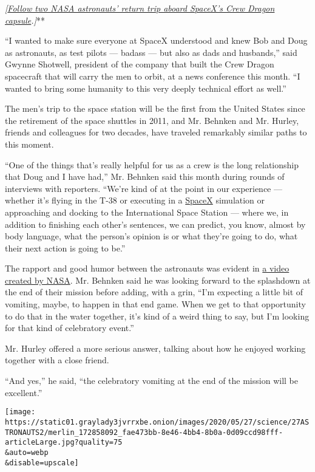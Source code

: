 \emph{\emph{\emph{{[}}\href{https://www.nytimes3xbfgragh.onion/2020/08/02/science/spacex-nasa-return.html}{\emph{Follow
two NASA astronauts' return trip aboard SpaceX's Crew Dragon
capsule}}}.{]}}**

``I wanted to make sure everyone at SpaceX understood and knew Bob and
Doug as astronauts, as test pilots --- badass --- but also as dads and
husbands,'' said Gwynne Shotwell, president of the company that built
the Crew Dragon spacecraft that will carry the men to orbit, at a news
conference this month. ``I wanted to bring some humanity to this very
deeply technical effort as well.''

The men's trip to the space station will be the first from the United
States since the retirement of the space shuttles in 2011, and Mr.
Behnken and Mr. Hurley, friends and colleagues for two decades, have
traveled remarkably similar paths to this moment.

``One of the things that's really helpful for us as a crew is the long
relationship that Doug and I have had,'' Mr. Behnken said this month
during rounds of interviews with reporters. ``We're kind of at the point
in our experience --- whether it's flying in the T-38 or executing in a
\href{https://www.nytimes3xbfgragh.onion/2020/05/27/fashion/SpaceX-Dragon-Suits.html}{SpaceX}
simulation or approaching and docking to the International Space Station
--- where we, in addition to finishing each other's sentences, we can
predict, you know, almost by body language, what the person's opinion is
or what they're going to do, what their next action is going to be.''

The rapport and good humor between the astronauts was evident in
\href{https://www.youtube.com/watch?v=gu4o5KgnAQM}{a video created by
NASA}. Mr. Behnken said he was looking forward to the splashdown at the
end of their mission before adding, with a grin, ``I'm expecting a
little bit of vomiting, maybe, to happen in that end game. When we get
to that opportunity to do that in the water together, it's kind of a
weird thing to say, but I'm looking for that kind of celebratory
event.''

Mr. Hurley offered a more serious answer, talking about how he enjoyed
working together with a close friend.

``And yes,'' he said, ``the celebratory vomiting at the end of the
mission will be excellent.''

\texttt{[image: https://static01.graylady3jvrrxbe.onion/images/2020/05/27/science/27ASTRONAUTS2/merlin\_172858092\_fae473bb-8e46-4bb4-8b0a-0d09ccd98fff-articleLarge.jpg?quality=75\\\&auto=webp\\\&disable=upscale]}

